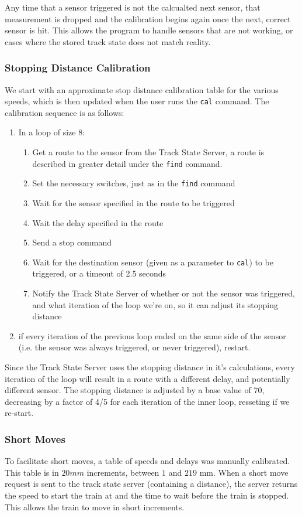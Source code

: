 \documentclass{article}
\begin{document}
Any time that a sensor triggered is not the calcualted next sensor, that measurement is dropped and the calibration begins again once the next, correct sensor is hit. This allows the program to handle sensors that are not working, or cases where the stored track state does not match reality.

\subsubsection{ Stopping Distance Calibration}
We start with an approximate stop distance calibration table for the various speeds, which is then updated when the user runs the \verb|cal| command. The calibration sequence is as follows: 
\begin{enumerate}
    \item In a loop of size 8:
    \begin{enumerate}
        \item Get a route to the sensor from the Track State Server, a route is described in greater detail under the \verb|find| command.
        \item Set the necessary switches, just as in the \verb|find| command
        \item Wait for the sensor specified in the route to be triggered
        \item Wait the delay specified in the route
        \item Send a stop command
        \item Wait for the destination sensor (given as a parameter to \verb|cal|) to be triggered, or a timeout of 2.5 seconds
        \item Notify the Track State Server of whether or not the sensor was triggered, and what iteration of the loop we're on, so it can adjust its stopping distance
    \end{enumerate}
    \item if every iteration of the previous loop ended on the same side of the sensor (i.e. the sensor was always triggered, or never triggered), restart.
\end{enumerate}
Since the Track State Server uses the stopping distance in it's calculations, every iteration of the loop will result in a route with a different delay, and potentially different sensor. The stopping distance is adjusted by a base value of 70, decreasing by a factor of 4/5 for each iteration of the inner loop, resseting if we re-start.

\subsubsection{ Short Moves }
To facilitate short moves, a table of speeds and delays was manually calibrated. This table is in $20mm$ increments, between $1$ and $219$ mm. When a short move request is sent to the track state server (containing a distance), the server returns the speed to start the train at and the time to wait before the train is stopped. This allows the train to move in short increments.
\end{document}
